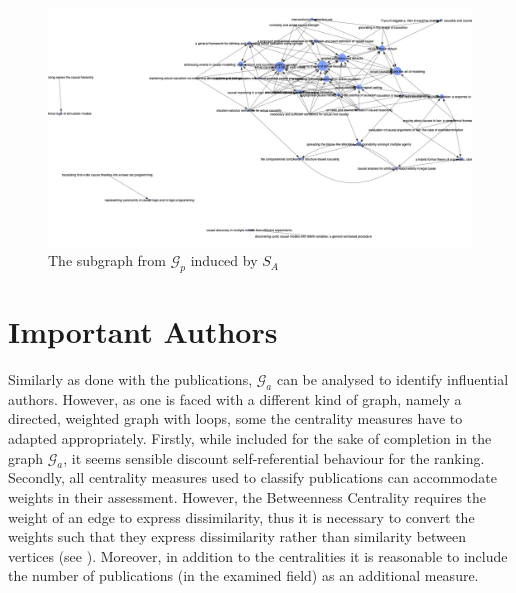 \documentclass[11pt,a4paper]{book}
\theoremstyle{definition}
\theoremstyle{definition}
\theoremstyle{definition}
\theoremstyle{remark}
\newcommand{\prset}{S_{A}}
\newcommand{\pgraph}{\mathcal{G}_{p}}
\newcommand{\agraph}{\mathcal{G}_{a}}
\begin{document}
\begin{figure}[h]
\includegraphics[width=\textwidth]{important_pgraph.png}
\caption{The subgraph from $\pgraph$ induced by $\prset$}
\label{fig:pgraph-important}
\end{figure}

\clearpage




\section{Important Authors}

Similarly as done with the publications, $\agraph$ can be analysed to identify influential authors. However, as one is faced with a different kind of graph, namely a directed, weighted graph with loops, some the centrality measures have to adapted appropriately. Firstly, while included for the sake of completion in the graph $\agraph$, it seems sensible discount self-referential behaviour for the ranking. Secondly, all centrality measures used to classify publications
can accommodate weights in their assessment. However, the Betweenness Centrality requires the weight of an edge to express dissimilarity, thus it is necessary to convert the weights such that they express dissimilarity rather than similarity between vertices (see \cite[p.~13]{runkler2012data}). Moreover, in addition to the centralities it is reasonable to include the number of publications (in the examined field) as an additional measure. 
\end{document}
